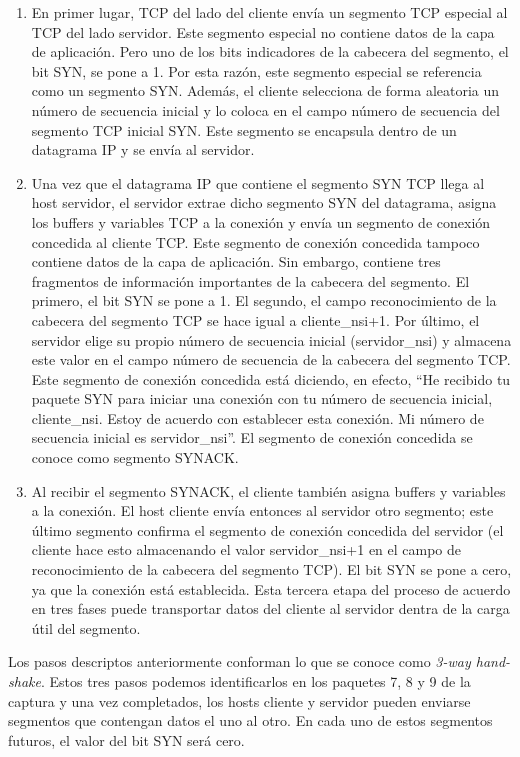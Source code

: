 \documentclass[osajnl,twocolumn,showpacs,superscriptaddress,10pt]{revtex4-1} %
\begin{document}
\begin{enumerate}[1.]
    \item En primer lugar, TCP del lado del cliente envía un segmento TCP especial al TCP del lado servidor. Este segmento especial no contiene datos de la capa de aplicación. Pero uno de los bits indicadores de la cabecera del segmento, el bit SYN, se pone a 1. Por esta razón, este segmento especial se referencia como un segmento SYN. Además, el cliente selecciona de forma aleatoria un número de secuencia inicial y lo coloca en el campo número de secuencia del segmento TCP inicial SYN. Este segmento se encapsula dentro de un datagrama IP y se envía al servidor.

    \item Una vez que el datagrama IP que contiene el segmento SYN TCP llega al host servidor, el servidor extrae dicho segmento SYN del datagrama, asigna los buffers y variables TCP a la conexión y envía un segmento de conexión concedida al cliente TCP. Este segmento de conexión concedida tampoco contiene datos de la capa de aplicación. Sin embargo, contiene tres fragmentos de información importantes de la cabecera del segmento. El primero, el bit SYN se pone a 1. El segundo, el campo reconocimiento de la cabecera del segmento TCP se hace igual a cliente\_nsi+1. Por último, el servidor elige su propio número de secuencia inicial (servidor\_nsi) y almacena este valor en el campo número de secuencia de la cabecera del segmento TCP. Este segmento de conexión concedida está diciendo, en efecto, “He recibido tu paquete SYN para iniciar una conexión con tu número de secuencia inicial, cliente\_nsi. Estoy de acuerdo con establecer esta conexión. Mi número de secuencia inicial es servidor\_nsi”. El segmento de conexión concedida se conoce como segmento SYNACK.
    
    \item  Al recibir el segmento SYNACK, el cliente también asigna buffers y variables a la conexión. El host cliente envía entonces al servidor otro segmento; este último segmento confirma el segmento de conexión concedida del servidor (el cliente hace esto almacenando el valor servidor\_nsi+1 en el campo de reconocimiento de la cabecera del segmento TCP). El bit SYN se pone a cero, ya que la conexión está establecida. Esta tercera etapa del proceso de acuerdo en tres fases puede transportar datos del cliente al servidor dentra de la carga útil del segmento.
\end{enumerate}

Los pasos descriptos anteriormente conforman lo que se conoce como \textit{3-way hand-shake}. Estos tres pasos podemos identificarlos en los paquetes 7, 8 y 9 de la 
captura y una vez completados, los hosts cliente y servidor pueden enviarse segmentos que contengan datos el uno al otro. En cada uno de estos segmentos futuros, 
el valor del bit SYN será cero. \\
\end{document}
